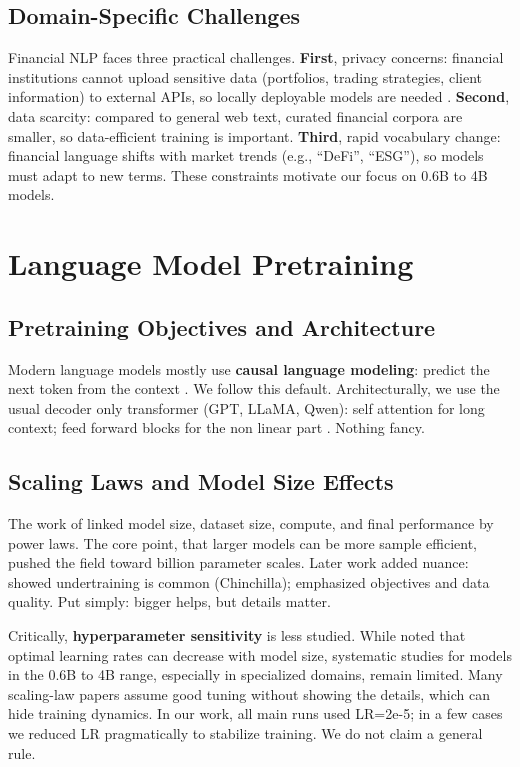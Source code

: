 \subsection{Domain-Specific Challenges}

Financial NLP faces three practical challenges. \textbf{First}, privacy concerns: financial institutions cannot upload sensitive data (portfolios, trading strategies, client information) to external APIs, so locally deployable models are needed \parencite{wu2023bloomberggpt}. \textbf{Second}, data scarcity: compared to general web text, curated financial corpora are smaller, so data-efficient training is important. \textbf{Third}, rapid vocabulary change: financial language shifts with market trends (e.g., ``DeFi'', ``ESG''), so models must adapt to new terms. These constraints motivate our focus on 0.6B to 4B models.

\section{Language Model Pretraining}

\subsection{Pretraining Objectives and Architecture}

Modern language models mostly use \textbf{causal language modeling}: predict the next token from the context \parencite{radford2019language, brown2020language}. We follow this default. Architecturally, we use the usual decoder only transformer (GPT, LLaMA, Qwen): self attention for long context; feed forward blocks for the non linear part \parencite{vaswani2017attention, touvron2023llama}. Nothing fancy.

\subsection{Scaling Laws and Model Size Effects}

The work of \textcite{kaplan2020scaling} linked model size, dataset size, compute, and final performance by power laws. The core point, that larger models can be more sample efficient, pushed the field toward billion parameter scales. Later work added nuance: \textcite{hoffmann2022training} showed undertraining is common (Chinchilla); \textcite{tay2022ul2} emphasized objectives and data quality. Put simply: bigger helps, but details matter.

Critically, \textbf{hyperparameter sensitivity} is less studied. While \textcite{mccandlish2018empirical} noted that optimal learning rates can decrease with model size, systematic studies for models in the 0.6B to 4B range, especially in specialized domains, remain limited. Many scaling-law papers assume good tuning without showing the details, which can hide training dynamics. In our work, all main runs used LR=2e-5; in a few cases we reduced LR pragmatically to stabilize training. We do not claim a general rule.

